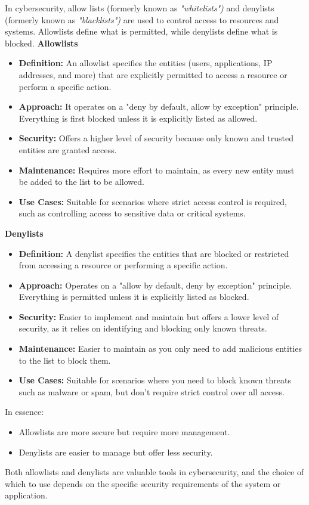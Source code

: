  In cybersecurity, allow lists (formerly known as \textit{"whitelists")} and denylists (formerly known as \textit{"blacklists")} are used to control access to resources and systems. Allowlists define what is permitted, while denylists define what is blocked.
\textbf{Allowlists}
\begin{itemize}
    \item \textbf{Definition:} An allowlist specifies the entities (users, applications, IP addresses, and more) that are explicitly permitted to access a resource or perform a specific action.
    \item \textbf{Approach:} It operates on a "deny by default, allow by exception" principle. Everything is first blocked unless it is explicitly listed as allowed.
    \item \textbf{Security:} Offers a higher level of security because only known and trusted entities are granted access.
    \item \textbf{Maintenance:} Requires more effort to maintain, as every new entity must be added to the list to be allowed.
    \item \textbf{Use Cases:} Suitable for scenarios where strict access control is required, such as controlling access to sensitive data or critical systems.
\end{itemize}
\textbf{Denylists}
\begin{itemize}
    \item \textbf{Definition:} A denylist specifies the entities that are blocked or restricted from accessing a resource or performing a specific action.
    \item \textbf{Approach:} Operates on a "allow by default, deny by exception" principle. Everything is permitted unless it is explicitly listed as blocked.
    \item \textbf{Security:} Easier to implement and maintain but offers a lower level of security, as it relies on identifying and blocking only known threats.
    \item \textbf{Maintenance:} Easier to maintain as you only need to add malicious entities to the list to block them.
    \item \textbf{Use Cases:} Suitable for scenarios where you need to block known threats such as  malware or spam, but don't require strict control over all access.
\end{itemize}
In essence:
\begin{itemize}
    \item Allowlists are more secure but require more management.
    \item Denylists are easier to manage but offer less security.
\end{itemize}
Both allowlists and denylists are valuable tools in cybersecurity, and the choice of which to use depends on the specific security requirements of the system or application.

